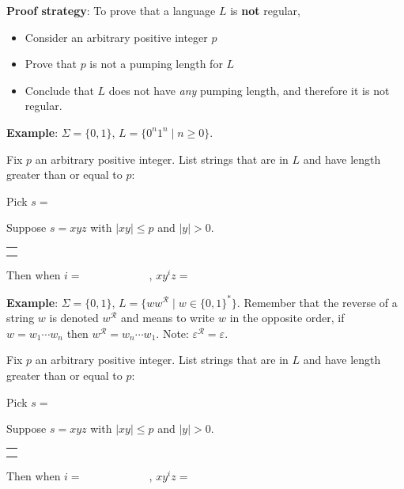 \documentclass[12pt, oneside]{article}
\begin{document}
{\bf Proof strategy}: To prove that a language $L$ is {\bf not} regular, 
\begin{itemize}
    \item Consider an arbitrary positive integer $p$
    \item Prove that $p$ is not a pumping length for $L$
    \item Conclude that $L$ does not have {\it any} pumping length, and therefore it is not regular.
\end{itemize}

\newpage
{\bf Example}: $\Sigma  =  \{0,1\}$, $L = \{ 0^n 1^n \mid n  \geq 0\}$.

Fix $p$ an arbitrary positive integer. List strings that are in $L$ and have length  greater than or equal  to $p$:

\vspace{20pt}

Pick $s = $


Suppose $s = xyz$ with  $|xy|  \leq  p$ and $|y| > 0$.
\begin{center}
\begin{tabular}{|c|}
\hline
 \\
\hspace{4in} \\
\hline
\end{tabular}
\end{center}

Then when $i = \hspace{1in}$, $xy^i z  = \hspace{1in}$

\newpage

{\bf Example}: $\Sigma  =  \{0,1\}$, $L = \{w w^{\mathcal{R}} \mid w \in \{0,1\}^*\}$.
Remember that the reverse of a string $w$ is denoted $w^\mathcal{R}$  
and means to write $w$  in  the opposite order, if $w = w_1 \cdots  w_n$ then $w^\mathcal{R} = w_n \cdots  w_1$. Note: $\varepsilon^\mathcal{R} = \varepsilon$.


Fix $p$ an arbitrary positive integer. List strings that are in $L$ and have length  greater than or equal  to $p$:

\vspace{10pt}

Pick $s = $

Suppose $s = xyz$ with  $|xy|  \leq  p$ and $|y| > 0$.
\begin{center}
\begin{tabular}{|c|}
\hline
 \\
\hspace{4in} \\
\hline
\end{tabular}
\end{center}
Then when $i = \hspace{1in}$, $xy^i z  = \hspace{1in}$
\end{document}
